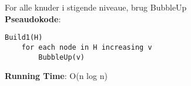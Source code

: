 For alle knuder i stigende niveaue, brug BubbleUp\\
\textbf{Pseaudokode}:
\begin{lstlisting}[frame=single, mathescape=true]
Build1(H)
	for each node in H increasing v
		BubbleUp(v)
\end{lstlisting}
\textbf{Running Time}: O(n log n)